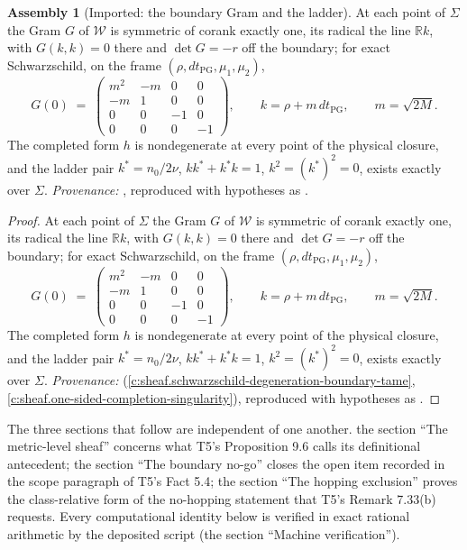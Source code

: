 \documentclass[11pt]{article}
\theoremstyle{definition}
\newtheorem{assembled}[theorem]{Assembly}
\theoremstyle{plain}
\providecommand{\R}{}\renewcommand{\R}{\mathbb{R}}
\providecommand{\Sig}{}\renewcommand{\Sig}{\Sigma}
\providecommand{\nO}{}\renewcommand{\nO}{n_0}
\providecommand{\shW}{}\renewcommand{\shW}{\mathcal{W}}
\begin{document}
\begin{assembled}[Imported: the boundary Gram and the ladder]\label{c:three-routes.imported-boundary-gram-ladder}
At each point of $\Sig$ the Gram $G$ of $\shW$ is symmetric of corank exactly one, its radical the line $\R k$, with $G(k,k) = 0$ there and $\det G = -r$ off the boundary; for exact Schwarzschild, on the frame $(\rho, dt_{\mathrm{PG}}, \mu_1, \mu_2)$,
\[
G(0) \;=\; \begin{pmatrix} m^2 & -m & 0 & 0\\ -m & 1 & 0 & 0\\ 0 & 0 & -1 & 0\\ 0 & 0 & 0 & -1 \end{pmatrix}, \qquad k = \rho + m\,dt_{\mathrm{PG}}, \qquad m = \sqrt{2M}.
\]
The completed form $h$ is nondegenerate at every point of the physical closure, and the ladder pair $k^{*} = \nO/2\nu$, $kk^{*} + k^{*}k = 1$, $k^{2} = (k^{*})^{2} = 0$, exists exactly over $\Sig$. \emph{Provenance:} \cite[Thms 8.7, 8.12]{ButlerT4}, reproduced with hypotheses as \cite[Facts B.1, B.2]{ButlerT5}.
\end{assembled}
\begin{proof}
At each point of $\Sig$ the Gram $G$ of $\shW$ is symmetric of corank exactly one, its radical the line $\R k$, with $G(k,k) = 0$ there and $\det G = -r$ off the boundary; for exact Schwarzschild, on the frame $(\rho, dt_{\mathrm{PG}}, \mu_1, \mu_2)$,
\[
G(0) \;=\; \begin{pmatrix} m^2 & -m & 0 & 0\\ -m & 1 & 0 & 0\\ 0 & 0 & -1 & 0\\ 0 & 0 & 0 & -1 \end{pmatrix}, \qquad k = \rho + m\,dt_{\mathrm{PG}}, \qquad m = \sqrt{2M}.
\]
The completed form $h$ is nondegenerate at every point of the physical closure, and the ladder pair $k^{*} = \nO/2\nu$, $kk^{*} + k^{*}k = 1$, $k^{2} = (k^{*})^{2} = 0$, exists exactly over $\Sig$. \emph{Provenance:} \cite[Thms 8.7, 8.12]{ButlerT4} (\ref{c:sheaf.schwarzschild-degeneration-boundary-tame}, \ref{c:sheaf.one-sided-completion-singularity}), reproduced with hypotheses as \cite[Facts B.1, B.2]{ButlerT5}.

\end{proof}

\label{c:note.three-routes.setting-setting-what-imported-2}
The three sections that follow are independent of one another. the section ``The metric-level sheaf'' concerns what T5's Proposition 9.6 calls its definitional antecedent; the section ``The boundary no-go'' closes the open item recorded in the scope paragraph of T5's Fact 5.4; the section ``The hopping exclusion'' proves the class-relative form of the no-hopping statement that T5's Remark 7.33(b) requests. Every computational identity below is verified in exact rational arithmetic by the deposited script (the section ``Machine verification'').
\end{document}
